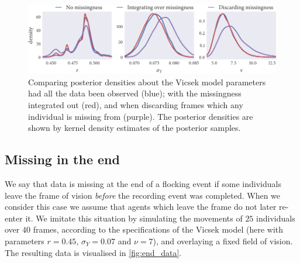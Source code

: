 \begin{figure}[tbp]
  \includegraphics{beg/compare_params.pdf}
  \caption{Comparing posterior densities about the Vicsek model parameters had
    all the data been observed (blue); with the missingness integrated out
    (red), and when discarding frames which any individual is missing from
    (purple). The posterior densities are shown by kernel density estimates
    of the posterior samples.}
  \label{fig:beg_compare}
\end{figure}

\subsection{Missing in the end}
\label{ssec:end_missing}

We say that data is missing at the end of a flocking event if some individuals
leave the frame of vision \emph{before} the recording event was completed. When
we consider this case we assume that agents which leave the frame do not later
re-enter it. We imitate this situation by simulating the movements of $25$
individuals over $40$ frames, according to the specifications of the Vicsek
model (here with parameters $r=0.45$, $\sigma_Y=0.07$ and $\nu=7$), and
overlaying a fixed field of vision. The resulting data is visualised in
\cref{fig:end_data}.

